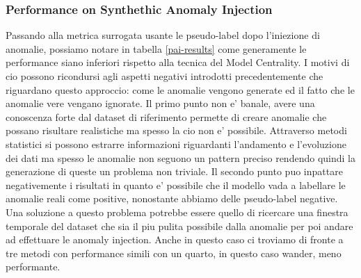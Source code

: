 \newpage
\subsubsection{Performance on Synthethic Anomaly Injection}
Passando alla metrica surrogata usante le pseudo-label dopo l'iniezione di anomalie, possiamo notare in tabella \ref{pai-results} come generamente le performance siano inferiori rispetto alla tecnica del Model Centrality. I motivi di cio possono ricondursi agli aspetti negativi introdotti precedentemente che riguardano questo approccio: come le anomalie vengono generate ed il fatto che le anomalie vere vengano ignorate. Il primo punto non e' banale, avere una conoscenza forte dal dataset di riferimento permette di creare anomalie che possano risultare realistiche ma spesso la cio non e' possibile. Attraverso metodi statistici si possono estrarre informazioni riguardanti l'andamento e l'evoluzione dei dati ma spesso le anomalie non seguono un pattern preciso rendendo quindi la generazione di queste un problema non triviale. Il secondo punto puo inpattare negativemente i risultati in quanto e' possibile che il modello vada a labellare le anomalie reali come positive, nonostante abbiamo delle pseudo-label negative. Una soluzione a questo problema potrebbe essere quello di ricercare una finestra temporale del dataset che sia il piu pulita possibile dalla anomalie per poi andare ad effettuare le anomaly injection.
Anche in questo caso ci troviamo di fronte a tre metodi con performance simili con un quarto, in questo caso wander, meno performante.

